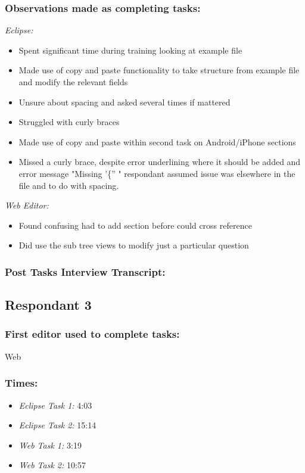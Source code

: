 \documentclass{report}
\begin{document}
\subsubsection*{Observations made as completing tasks:}

\emph{Eclipse:}
\begin{itemize}
\item Spent significant time during training looking at example file
\item Made use of copy and paste functionality to take structure from example file and modify the relevant fields
\item Unsure about spacing and asked several times if mattered
\item Struggled with curly braces
\item Made use of copy and paste within second task on Android/iPhone sections
\item Missed a curly brace, despite error underlining where it should be added and error message "Missing '\{'' " respondant assumed issue was elsewhere in the file and to do with spacing.
\end{itemize}
\emph{Web Editor:}
\begin{itemize}
\item Found confusing had to add section before could cross reference
\item Did use the sub tree views to modify just a particular question
\end{itemize}

\subsubsection*{Post Tasks Interview Transcript:}

\newpage
\subsection{Respondant 3}
\subsubsection*{First editor used to complete tasks:} Web
\subsubsection*{Times:}
\begin{itemize}
\item \emph{Eclipse Task 1:} 4:03
\item \emph{Eclipse Task 2:} 15:14
\item \emph{Web Task 1:} 3:19
\item \emph{Web Task 2:} 10:57
\end{itemize}
\end{document}
